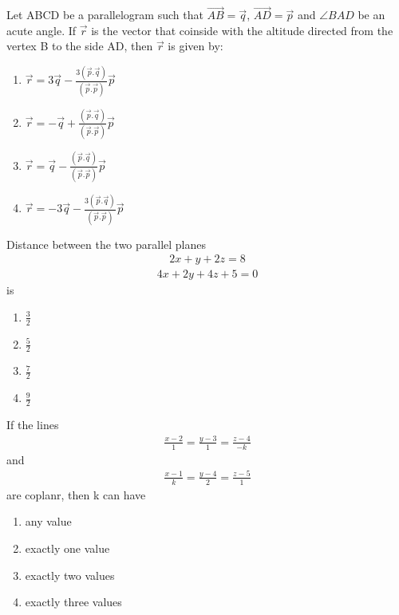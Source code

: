 \item Let ABCD be a parallelogram such that $\overrightarrow{AB}=\overrightarrow{q}$, $\overrightarrow{AD}=\overrightarrow{p}$ and $\angle BAD$ be an acute angle. If $\overrightarrow{r}$ is the vector that coinside with the altitude directed from the vertex B to the side AD, then $\overrightarrow{r}$ is given by:
\begin{enumerate}
\item $\overrightarrow{r}=3\overrightarrow{q}-\frac{3(\overrightarrow{p}.\overrightarrow{q})}{(\overrightarrow{p}.\overrightarrow{p})}\overrightarrow{p}$
\item $\overrightarrow{r}=-\overrightarrow{q}+\frac{(\overrightarrow{p}.\overrightarrow{q})}{(\overrightarrow{p}.\overrightarrow{p})}\overrightarrow{p}$
\item $\overrightarrow{r}=\overrightarrow{q}-\frac{(\overrightarrow{p}.\overrightarrow{q})}{(\overrightarrow{p}.\overrightarrow{p})}\overrightarrow{p}$
\item $\overrightarrow{r}=-3\overrightarrow{q}-\frac{3(\overrightarrow{p}.\overrightarrow{q})}{(\overrightarrow{p}.\overrightarrow{p})}\overrightarrow{p}$
\end{enumerate}

\item Distance between the two parallel planes
\begin{align*}
2x+y+2z=8
\end{align*}
\begin{align*}
4x+2y+4z+5=0
\end{align*}
is
\begin{enumerate}
\item $\frac{3}{2}$
\item $\frac{5}{2}$
\item $\frac{7}{2}$
\item $\frac{9}{2}$
\end{enumerate}

\item If the lines 
\begin{align*}
\frac{x-2}{1}=\frac{y-3}{1}=\frac{z-4}{-k}
\end{align*}
and 
\begin{align*}
\frac{x-1}{k}=\frac{y-4}{2}=\frac{z-5}{1}
\end{align*}
are coplanr, then k can have
\begin{enumerate}
\item any value
\item exactly one value
\item exactly two values
\item exactly three values
\end{enumerate}

